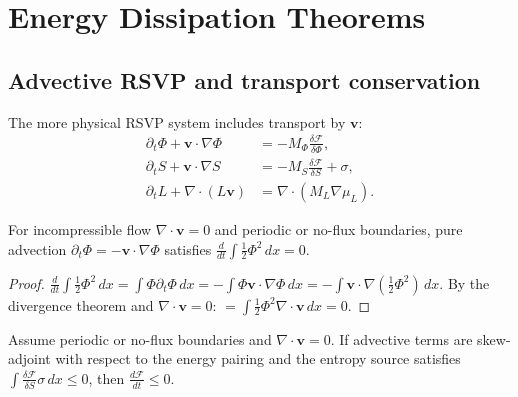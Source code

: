 
\chapter{Energy Dissipation Theorems}
\label{ch:energy-dissipation}

\section{Advective RSVP and transport conservation}

The more physical RSVP system includes transport by $\mathbf{v}$:
\begin{align*}
  \partial_t\Phi + \mathbf{v}\cdot\nabla\Phi
  &= -M_\Phi\frac{\delta\mathcal{F}}{\delta\Phi},\\
  \partial_t S + \mathbf{v}\cdot\nabla S
  &= -M_S\frac{\delta\mathcal{F}}{\delta S} + \sigma,\\
  \partial_t L + \nabla\cdot(L\mathbf{v})
  &= \nabla\cdot(M_L\nabla\mu_L).
\end{align*}

\begin{proposition}
  \label{prop:adv-neutral}
  \statusproven{}
  For incompressible flow $\nabla\cdot\mathbf{v} = 0$ and
  periodic or no-flux boundaries,
  pure advection $\partial_t\Phi = -\mathbf{v}\cdot\nabla\Phi$
  satisfies $\frac{d}{dt}\int\frac{1}{2}\Phi^2\,dx = 0$.
\end{proposition}

\begin{proof}
  $\frac{d}{dt}\int\frac{1}{2}\Phi^2\,dx
  = \int\Phi\partial_t\Phi\,dx
  = -\int\Phi\mathbf{v}\cdot\nabla\Phi\,dx
  = -\int\mathbf{v}\cdot\nabla(\frac{1}{2}\Phi^2)\,dx$.
  By the divergence theorem and $\nabla\cdot\mathbf{v}=0$:
  $= \int\frac{1}{2}\Phi^2\nabla\cdot\mathbf{v}\,dx = 0$.
\end{proof}

\begin{theorem}
  \label{thm:rsvp-adv-dissipation}
  \statusproven{}
  Assume periodic or no-flux boundaries and $\nabla\cdot\mathbf{v}=0$.
  If advective terms are skew-adjoint with respect to the
  energy pairing and the entropy source satisfies
  $\int\frac{\delta\mathcal{F}}{\delta S}\sigma\,dx \leq 0$,
  then $\frac{d\mathcal{F}}{dt} \leq 0$.
\end{theorem}

